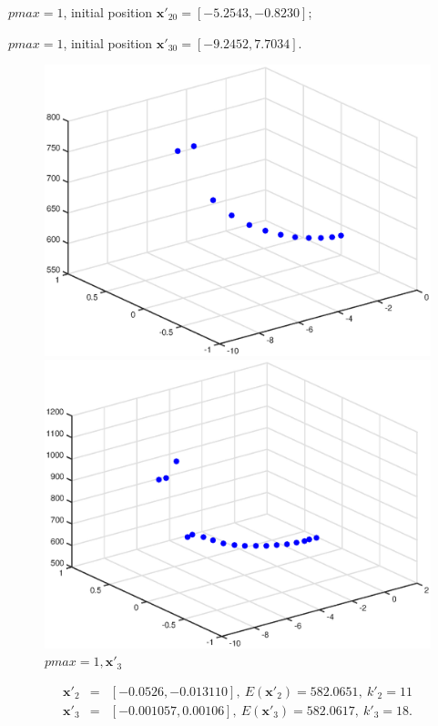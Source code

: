 \documentclass{article}
\begin{document}
$pmax=1$, initial position $\mathbf{x}'_{20} = [-5.2543,-0.8230]$;

$pmax=1$, initial position $\mathbf{x}'_{30} = [-9.2452,7.7034]$.
\begin{figure}[h]
\begin{minipage}[t]{0.5\linewidth}
\centering
\includegraphics[scale=0.34]{30}
\caption{$pmax=1,\mathbf{x}'_{2}$}
\end{minipage}%
\begin{minipage}[t]{0.5\linewidth}
\centering
\includegraphics[scale=0.34]{31}
\caption{$pmax=1,\mathbf{x}'_{3}$}
\end{minipage}
\end{figure}
\begin{eqnarray*}
\mathbf{x}'_{2} &=& [-0.0526,-0.013110], ~E(\mathbf{x}'_{2}) = 582.0651, ~k'_2 = 11 \\
\mathbf{x}'_{3} &=& [-0.001057,0.00106], ~E(\mathbf{x}'_{3}) = 582.0617, ~k'_3 = 18.
\end{eqnarray*}
\end{document}
